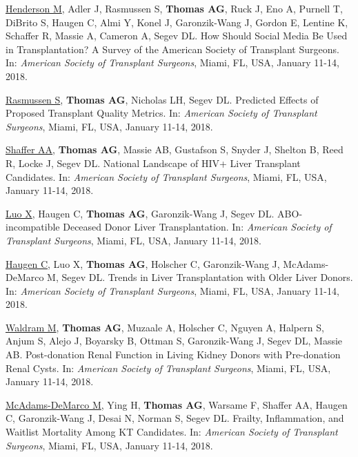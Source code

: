 \documentclass[10pt]{article}
\makeatletter
\newlength{\bibhang}
\newlength{\bibsep}
 {\@listi \global\bibsep\itemsep \global\advance\bibsep by\parsep}
\newenvironment{bibenum*}
  {\renewcommand\labelenumi{[\theenumi]}%
   \etaremune[
     topsep=0pt,
     itemsep=\bibsep,
     parsep=0pt,partopsep=0pt,
     itemindent=-\bibhang,
     leftmargin={\bibhang+\widthof{[999]}}]}
  {\endetaremune}
\makeatother
\begin{document}
\begin{bibenum*}
\item \underline{Henderson M}, Adler J, Rasmussen S, \textbf{Thomas AG},
  Ruck J, Eno A, Purnell T, DiBrito S, Haugen C, Almi Y, Konel J,
  Garonzik-Wang J, Gordon E, Lentine K, Schaffer R, Massie A,
  Cameron A, Segev DL.
  How Should Social Media Be Used in Transplantation? A Survey of
  the American Society of Transplant Surgeons.
  In: \emph{American Society of Transplant Surgeons},
  Miami, FL, USA, January 11-14, 2018.

\item \underline{Rasmussen S}, \textbf{Thomas AG}, Nicholas LH, Segev DL.
  Predicted Effects of Proposed Transplant Quality Metrics.
  In: \emph{American Society of Transplant Surgeons},
  Miami, FL, USA, January 11-14, 2018.

\item \underline{Shaffer AA}, \textbf{Thomas AG}, Massie AB,
  Gustafson S, Snyder J, Shelton B, Reed R, Locke J, Segev DL.
  National Landscape of HIV+ Liver Transplant
  Candidates. In: \emph{American Society of Transplant Surgeons},
  Miami, FL, USA, January 11-14, 2018.

\item \underline{Luo X}, Haugen C, \textbf{Thomas AG}, Garonzik-Wang J,
  Segev DL.
  ABO-incompatible Deceased Donor Liver Transplantation.
  In: \emph{American Society of Transplant Surgeons},
  Miami, FL, USA, January 11-14, 2018.

\item \underline{Haugen C}, Luo X, \textbf{Thomas AG}, Holscher C,
  Garonzik-Wang J, McAdams-DeMarco M, Segev DL.
  Trends in Liver Transplantation with Older Liver Donors.
  In: \emph{American Society of Transplant Surgeons},
  Miami, FL, USA, January 11-14, 2018.

\item \underline{Waldram M}, \textbf{Thomas AG}, Muzaale A,
  Holscher C, Nguyen A, Halpern S, Anjum S, Alejo J, Boyarsky B, Ottman S,
  Garonzik-Wang J, Segev DL, Massie AB. Post-donation Renal Function in Living
  Kidney Donors with Pre-donation Renal Cysts.
  In: \emph{American Society of Transplant Surgeons},
  Miami, FL, USA, January 11-14, 2018.

\item \underline{McAdams-DeMarco M}, Ying H, \textbf{Thomas AG}, Warsame F,
  Shaffer AA, Haugen C, Garonzik-Wang J, Desai N, Norman S, Segev DL.
  Frailty, Inflammation, and Waitlist Mortality Among KT Candidates.
  In: \emph{American Society of Transplant Surgeons},
  Miami, FL, USA, January 11-14, 2018.


\end{bibenum*}
\end{document}
